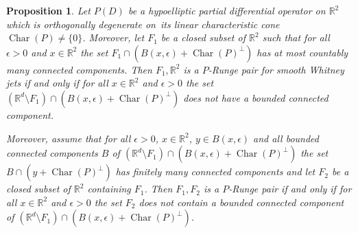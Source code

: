 \documentclass[a4paper,10pt]{amsart}
\newtheorem{proposition}[theorem]{Proposition}
\newtheorem*{crucial lemma}{Lemma \ref{lem:nice polynomial2}}
\theoremstyle{definition}
\newcommand{\R}{\mathbb{R}}
\newcommand{\charcone}{\operatorname{Char}}
\newcommand{\veryniceon}[1]{orthogonally degenerate on~#1}
\begin{document}
\begin{proposition}\label{prop:P-Runge R2}
Let $P(D)$ be a hypoelliptic partial differential operator on $\R^2$ which is \veryniceon{its linear characteristic cone} $\charcone(P)\neq\{0\}$. Moreover, let $F_1$ be a closed subset of $\R^2$ such that for all $\epsilon>0$ and $x\in\R^2$ the set $F_1\cap (B(x,\epsilon)+\charcone(P)^\perp)$ has at most countably many connected components. Then $F_1,\R^2$ is a $P$-Runge pair for smooth Whitney jets if and only if for all $x\in\R^2$ and $\epsilon>0$ the set $(\R^d\setminus F_1)\cap (B(x,\epsilon)+\charcone(P)^\perp)$ does not have a bounded connected component.

Moreover, assume that for all $\epsilon>0$, $x\in\R^2$, $y\in B(x,\epsilon)$ and all bounded connected components $B$ of $(\R^d\setminus F_1)\cap (B(x,\epsilon)+\charcone(P)^\perp)$ the set  $B\cap (y+\charcone(P)^\perp)$ has finitely many connected components and let $F_2$ be a closed subset of $\R^2$ containing $F_1$. Then $F_1,F_2$ is a $P$-Runge pair if and only if for all $x\in\R^2$ and $\epsilon>0$ the set $F_2$ does not contain a bounded connected component of $(\R^d\setminus F_1)\cap (B(x,\epsilon)+\charcone(P)^\perp)$.
\end{proposition}
\end{document}

